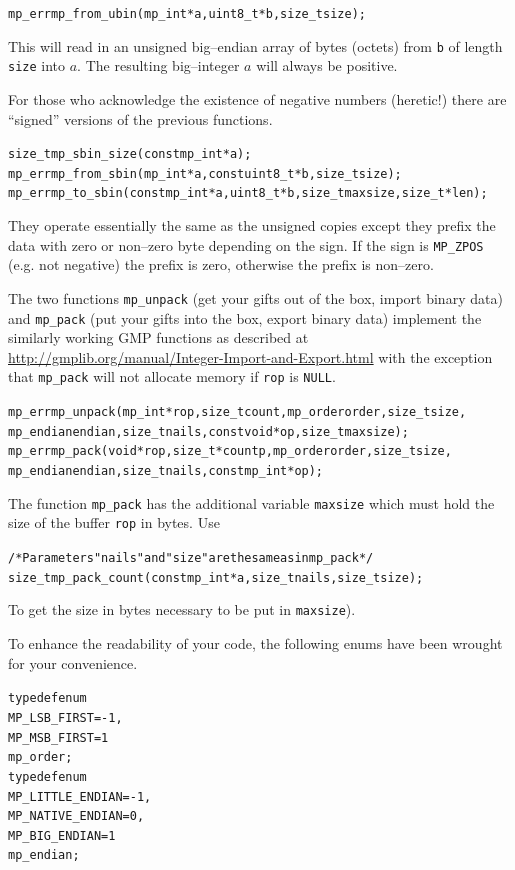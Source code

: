 \documentclass[synpaper]{book}
\begin{document}
\begin{alltt}
mp_err mp_from_ubin(mp_int *a, uint8_t *b, size_t size);
\end{alltt}
This will read in an unsigned big--endian array of bytes (octets) from \texttt{b} of length
\texttt{size} into $a$.  The resulting big--integer $a$ will always be positive.

For those who acknowledge the existence of negative numbers (heretic!) there are ``signed''
versions of the previous functions.
  
\begin{alltt}
size_t mp_sbin_size(const mp_int *a);
mp_err mp_from_sbin(mp_int *a, const uint8_t *b, size_t size);
mp_err mp_to_sbin(const mp_int *a, uint8_t *b, size_t maxsize, size_t *len);
\end{alltt}
They operate essentially the same as the unsigned copies except they prefix the data with zero or
non--zero byte depending on the sign. If the sign is \texttt{MP\_ZPOS} (e.g. not negative) the
prefix is zero, otherwise the prefix is non--zero.

The two functions \texttt{mp\_unpack} (get your gifts out of the box, import binary data) and
\texttt{mp\_pack} (put your gifts into the box, export binary data) implement the similarly working
GMP functions as described at \url{http://gmplib.org/manual/Integer-Import-and-Export.html} with
the exception that \texttt{mp\_pack} will not allocate memory if \texttt{rop} is \texttt{NULL}.
 
\begin{alltt}
mp_err mp_unpack(mp_int *rop, size_t count, mp_order order, size_t size,
             mp_endian endian, size_t nails, const void *op, size_t maxsize);
mp_err mp_pack(void *rop, size_t *countp, mp_order order, size_t size,
             mp_endian endian, size_t nails, const mp_int *op);
\end{alltt}
The function \texttt{mp\_pack} has the additional variable \texttt{maxsize} which must hold the
size of the buffer \texttt{rop} in bytes. Use
\begin{alltt}
/* Parameters "nails" and "size" are the same as in mp_pack */
size_t mp_pack_count(const mp_int *a, size_t nails, size_t size);
\end{alltt}
To get the size in bytes necessary to be put in \texttt{maxsize}).

To enhance the readability of your code, the following enums have been wrought for your
convenience.
\begin{alltt}
typedef enum {
   MP_LSB_FIRST = -1,
   MP_MSB_FIRST =  1
} mp_order;
typedef enum {
   MP_LITTLE_ENDIAN  = -1,
   MP_NATIVE_ENDIAN  =  0,
   MP_BIG_ENDIAN     =  1
} mp_endian;
\end{alltt}
\end{document}
